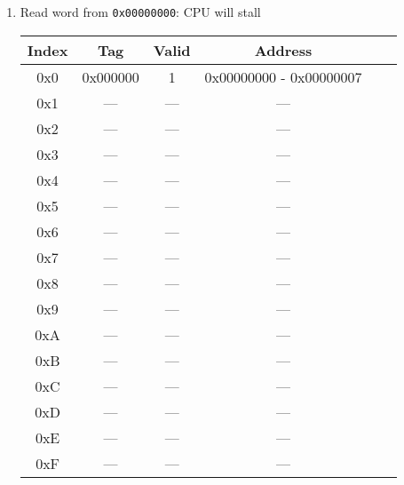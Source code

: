 \documentclass[12pt,letterpaper,titlepage]{article}
\begin{document}
\begin{raggedright}
\begin{enumerate}
    \item Read word from \texttt{0x00000000}: CPU will stall
\begin{center}
\def\arraystretch{1.35}
\begin{tabular}{|c|c|c|c|c|c|}
  \hline Index & Tag      & Valid & Address    
\\\hline 0x0   & 0x000000 & 1     & 0x00000000 - 0x00000007
\\\hline 0x1   & ---      & ---   & ---        
\\\hline 0x2   & ---      & ---   & ---        
\\\hline 0x3   & ---      & ---   & ---        
\\\hline 0x4   & ---      & ---   & ---        
\\\hline 0x5   & ---      & ---   & ---        
\\\hline 0x6   & ---      & ---   & ---        
\\\hline 0x7   & ---      & ---   & ---        
\\\hline 0x8   & ---      & ---   & ---        
\\\hline 0x9   & ---      & ---   & ---        
\\\hline 0xA   & ---      & ---   & ---        
\\\hline 0xB   & ---      & ---   & ---        
\\\hline 0xC   & ---      & ---   & ---        
\\\hline 0xD   & ---      & ---   & ---        
\\\hline 0xE   & ---      & ---   & ---        
\\\hline 0xF   & ---      & ---   & ---        
\\\hline


\end{tabular}
\end{center}
\end{enumerate}
\end{raggedright}
\end{document}
